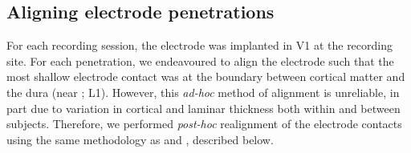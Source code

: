 %
%
%
%


\subsection{Aligning electrode penetrations}
\label{sec:lam_align}

For each recording session, the electrode was implanted in \ac{V1} at the recording site.
For each penetration, we endeavoured to align the electrode such that the most shallow electrode contact was at the boundary between cortical matter and the dura (near ; \acs{L1}).
However, this \textit{ad-hoc} method of alignment is unreliable, in part due to variation in cortical and laminar thickness both within and between subjects.
Therefore, we performed \textit{post-hoc} realignment of the electrode contacts using the same methodology as \citet{Self2013} and \citet{VanKerkoerle2014}, described below.

